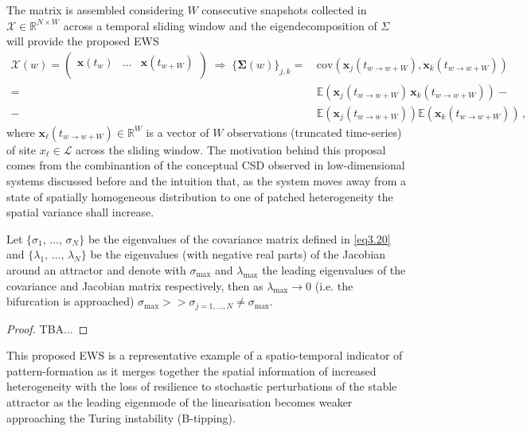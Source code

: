 \documentclass[../main.tex]{subfiles}
\begin{document}
The matrix is assembled considering $W$ consecutive snapshots collected in $\boldsymbol{\mathcal{X}}\in \mathbb{R}^{N\times W}$ across a temporal sliding window and the eigendecomposition of $\Sigma$ will provide the proposed EWS
\begin{align}
     \boldsymbol{\mathcal{X}}(w) = \begin{pmatrix}
                                        \boldsymbol{x}(t_{w}) & \dots & \boldsymbol{x}(t_{w + W}) \\
                                \end{pmatrix}	
                                \;\Rightarrow\;\Big\{\boldsymbol{\Sigma}(w)\Big\}_{j,k} =&\,\text{cov}(\boldsymbol{x}_{j}(t_{w\to w+W}), \boldsymbol{x}_{k}(t_{w\to w+W})) \nonumber \\
     =&\,\mathbb{E}(\boldsymbol{x}_{j}(t_{w\to w+W})\,\boldsymbol{x}_{k}(t_{w\to w+W})) - \nonumber \\
     -&\,\mathbb{E}(\boldsymbol{x}_{j}(t_{w\to w+W}))\mathbb{E}(\boldsymbol{x}_{k}(t_{w\to w+W}))\,, \label{eq3.20}
\end{align}
where $\boldsymbol{x}_{\ell}(t_{w\to w+W})\in \mathbb{R}^{W}$ is a vector of $W$ observations (truncated time-series) of site $x_{\ell}\in \mathcal{L}$ across the sliding window.
The motivation behind this proposal comes from the combinantion of the conceptual CSD observed in low-dimensional systems discussed before and the intuition that, as the system moves away from a state of spatially homogeneous distribution to one of patched heterogeneity the spatial variance shall increase.
\begin{theorem}[label=thm3.5]{}{}
        Let $\{\sigma_{1},\,\dots,\,\sigma_{N}\}$ be the eigenvalues of the covariance matrix defined in \eqref{eq3.20} and $\{\lambda_{1},\,\dots,\,\lambda_{N}\}$ be the eigenvalues (with negative real parts) of the Jacobian around an attractor and denote with $\sigma_{\text{max}}$ and $\lambda_{\text{max}}$ the leading eigenvalues of the covariance and Jacobian matrix respectively, then as $\lambda_{\text{max}}\to 0$ (i.e. the bifurcation is approached) $\sigma_{\text{max}}>>\sigma_{j=1,\dots,N}\neq\sigma_{\text{max}}$. 
\end{theorem}
\begin{proof}
     TBA...
\end{proof}
This proposed EWS is a representative example of a spatio-temporal indicator of pattern-formation as it merges together the spatial information of increased heterogeneity with the loss of resilience to stochastic perturbations of the stable attractor as the leading eigenmode of the linearisation becomes weaker approaching the Turing instability (B-tipping).
\end{document}
